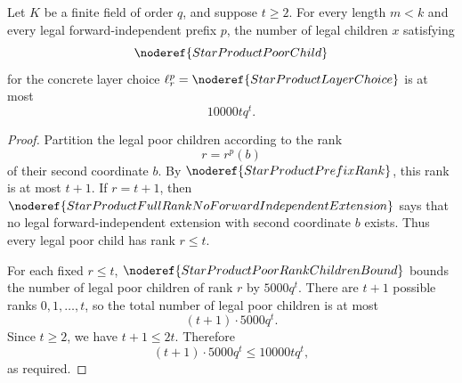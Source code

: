 \begin{helper}
Let \(K\) be a finite field of order \(q\), and suppose \(t\ge2\).  For
every length \(m<k\) and every legal forward-independent prefix \(p\), the
number of legal children \(x\) satisfying
\[
  \noderef{StarProductPoorChild}
\]
for the concrete layer choice
\(\ell^p_r=\noderef{StarProductLayerChoice}\) is at most
\[
  10000tq^t .
\]
\end{helper}
\begin{proof}
Partition the legal poor children according to the rank
\[
  r=r^p(b)
\]
of their second coordinate \(b\).  By \(\noderef{StarProductPrefixRank}\),
this rank is at most \(t+1\).  If \(r=t+1\), then
\(\noderef{StarProductFullRankNoForwardIndependentExtension}\) says that no
legal forward-independent extension with second coordinate \(b\) exists.
Thus every legal poor child has rank \(r\le t\).

For each fixed \(r\le t\),
\(\noderef{StarProductPoorRankChildrenBound}\) bounds the number of legal
poor children of rank \(r\) by \(5000q^t\).  There are \(t+1\) possible
ranks \(0,1,\ldots,t\), so the total number of legal poor children is at
most
\[
  (t+1)\cdot5000q^t.
\]
Since \(t\ge2\), we have \(t+1\le2t\).  Therefore
\[
  (t+1)\cdot5000q^t\le10000tq^t,
\]
as required.
\end{proof}
